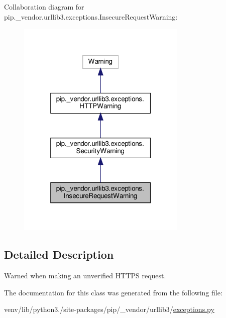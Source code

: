 Collaboration diagram for pip.\+\_\+vendor.\+urllib3.\+exceptions.\+Insecure\+Request\+Warning\+:
\nopagebreak
\begin{figure}[H]
\begin{center}
\leavevmode
\includegraphics[width=229pt]{classpip_1_1__vendor_1_1urllib3_1_1exceptions_1_1InsecureRequestWarning__coll__graph}
\end{center}
\end{figure}


\subsection{Detailed Description}
\begin{DoxyVerb}Warned when making an unverified HTTPS request.\end{DoxyVerb}
 

The documentation for this class was generated from the following file\+:\begin{DoxyCompactItemize}
\item 
venv/lib/python3./site-\/packages/pip/\+\_\+vendor/urllib3/\hyperlink{pip_2__vendor_2urllib3_2exceptions_8py}{exceptions.\+py}\end{DoxyCompactItemize}
